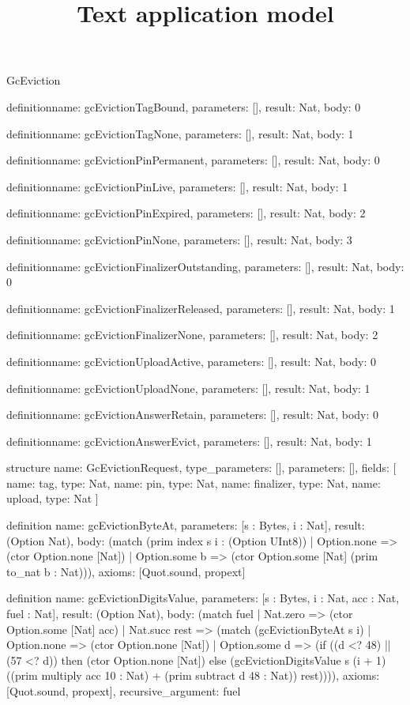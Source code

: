 \begin{lexlean}{GcEviction}
\title{Text application model}
\begin{semanticmodule}
definition{name: gcEvictionTagBound, parameters: [], result: Nat, body: 0}

definition{name: gcEvictionTagNone, parameters: [], result: Nat, body: 1}

definition{name: gcEvictionPinPermanent, parameters: [], result: Nat, body: 0}

definition{name: gcEvictionPinLive, parameters: [], result: Nat, body: 1}

definition{name: gcEvictionPinExpired, parameters: [], result: Nat, body: 2}

definition{name: gcEvictionPinNone, parameters: [], result: Nat, body: 3}

definition{name: gcEvictionFinalizerOutstanding, parameters: [], result: Nat, body: 0}

definition{name: gcEvictionFinalizerReleased, parameters: [], result: Nat, body: 1}

definition{name: gcEvictionFinalizerNone, parameters: [], result: Nat, body: 2}

definition{name: gcEvictionUploadActive, parameters: [], result: Nat, body: 0}

definition{name: gcEvictionUploadNone, parameters: [], result: Nat, body: 1}

definition{name: gcEvictionAnswerRetain, parameters: [], result: Nat, body: 0}

definition{name: gcEvictionAnswerEvict, parameters: [], result: Nat, body: 1}

structure{
  name: GcEvictionRequest,
  type_parameters: [],
  parameters: [],
  fields: [
    {name: tag, type: Nat},
    {name: pin, type: Nat},
    {name: finalizer, type: Nat},
    {name: upload, type: Nat}
  ]
}

definition{
  name: gcEvictionByteAt,
  parameters: [s : Bytes, i : Nat],
  result: (Option Nat),
  body: (match (prim index s i : (Option UInt8))
    | Option.none => (ctor Option.none [Nat])
    | Option.some b => (ctor Option.some [Nat] (prim to_nat b : Nat))),
  axioms: [Quot.sound, propext]
}

definition{
  name: gcEvictionDigitsValue,
  parameters: [s : Bytes, i : Nat, acc : Nat, fuel : Nat],
  result: (Option Nat),
  body: (match fuel
    | Nat.zero => (ctor Option.some [Nat] acc)
    | Nat.succ rest => (match (gcEvictionByteAt s i)
      | Option.none => (ctor Option.none [Nat])
      | Option.some d => (if ((d <? 48) || (57 <? d)) then (ctor Option.none [Nat]) else (gcEvictionDigitsValue s (i + 1) ((prim multiply acc 10 : Nat) + (prim subtract d 48 : Nat)) rest)))),
  axioms: [Quot.sound, propext],
  recursive_argument: fuel
}


\end{semanticmodule}
\end{lexlean}
